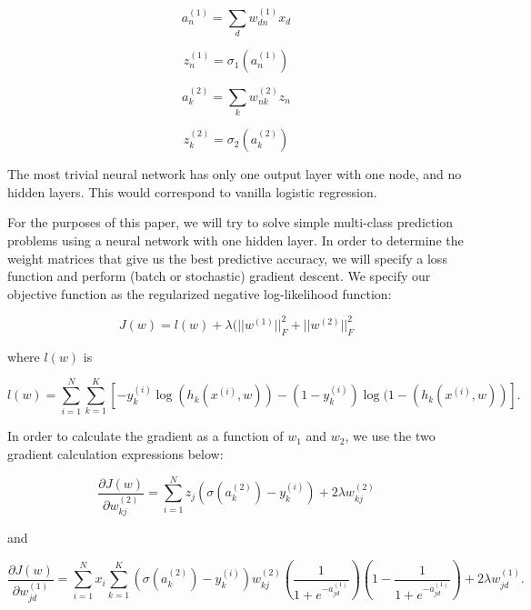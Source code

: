 \documentclass[10pt]{article}
\begin{document}
\begin{equation}
a_{n}^{(1)} = \sum_d w_{dn}^{(1)}x_d
\end{equation}

\begin{equation}
z_{n}^{(1)} = \sigma_1(a_n^{(1)})
\end{equation}

\begin{equation}
a_{k}^{(2)} = \sum_k w_{nk}^{(2)}z_n
\end{equation}

\begin{equation}
z_{k}^{(2)} = \sigma_2(a_k^{(2)})
\end{equation}

The most trivial neural network has only one output layer with one node, and no hidden layers. This would correspond to vanilla logistic regression. 

For the purposes of this paper, we will try to solve simple multi-class prediction problems using a neural network with one hidden layer. In order to determine the weight matrices that give us the best predictive accuracy, we will specify a loss function and perform (batch or stochastic) gradient descent. We specify our objective function as the regularized negative log-likelihood function:

\begin{equation}
J(w) = l(w) +\lambda(||w^{(1)}||^2_F + ||w^{(2)}||^2_F
\end{equation}

\noindent where $l(w)$ is

\begin{equation}
l(w) = \sum_{i=1}^N \sum_{k=1}^{K} [-y_k^{(i)}\log(h_k(x^{(i)},w)) - (1-y_k^{(i)})\log(1-(h_k(x^{(i)},w))].
\end{equation}

In order to calculate the gradient as a function of $w_1$ and $w_2$, we use the two gradient calculation expressions below:

\begin{equation}
\frac{\partial J(w)}{\partial w_{kj}^{(2)}} = \sum_{i=1}^N z_j \left(\sigma(a_k^{(2)}) -y_k^{(i)} \right) + 2 \lambda w_{kj}^{(2)}
\end{equation}

\noindent and 

\begin{equation}
\frac{\partial J(w)}{\partial w_{jd}^{(1)}} =  \sum_{i=1}^N x_i \sum_{k=1}^{K} \left(\sigma(a_k^{(2)}) -y_k^{(i)}\right) w_{kj}^{(2)} \left(\frac{1}{1+e^{-a_{jd}^{(1)}}}\right)\left(1-\frac{1}{1+e^{-a_{jd}^{(1)}}}\right) + 2 \lambda w_{jd}^{(1)}.
\end{equation}
\end{document}
